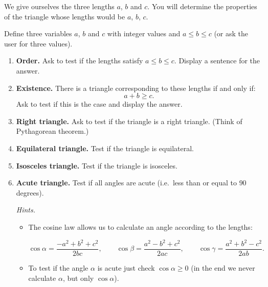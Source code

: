\documentclass[11pt,class=report,crop=false]{standalone}
\begin{document}
\begin{activite}[Triangles]


We give ourselves the three lengths $a$, $b$ and $c$. You will determine the properties of the triangle whose lengths would be $a$, $b$, $c$.



Define three variables $a$, $b$ and $c$ with integer values and $a \le b \le c$ (or ask the user for three values).

\begin{enumerate}
  \item \textbf{Order.} Ask \Python{} to test if the lengths satisfy $a \le b \le c$. Display a sentence for the answer.
  
  \item \textbf{Existence.} There is a triangle corresponding to these lengths if and only if:
  $$a + b \ge c.$$
  Ask \Python{} to test if this is the case and display the answer.
  
  
  \item \textbf{Right triangle.} Ask \Python{} to test if the triangle is a right triangle. (Think of Pythagorean theorem.)
  
   \item \textbf{Equilateral triangle.} Test if the triangle is equilateral. 
   
   \item \textbf{Isosceles triangle.} Test if the triangle is isosceles.   
   
   \item \textbf{Acute triangle.} Test if all angles are acute (i.e.~less than or equal to $90$ degrees).
   
    \emph{Hints.} 
    \begin{itemize}
      \item The cosine law allows us to calculate an angle according to the lengths:
      
   
   $$\cos \alpha = \frac{-a^2+b^2+c^2}{2bc},
   \qquad
   \cos \beta = \frac{a^2-b^2+c^2}{2ac},
   \qquad
   \cos \gamma = \frac{a^2+b^2-c^2}{2ab}.$$   

   \smallskip
   
    \item To test if the angle $\alpha$ is acute just check $\cos \alpha \ge 0$ (in the end we never calculate $\alpha$, but only $\cos \alpha$).
   
   \end{itemize} 
   
\end{enumerate}   
     
    \smallskip 
     
    
\end{activite}
\end{document}
